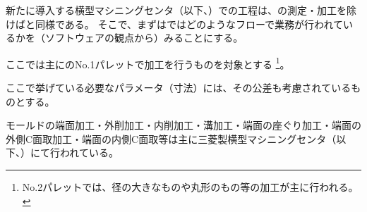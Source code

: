 

新たに導入する横型マシニングセンタ（以下、\textbf{\DMname}）での工程は、\dimple の測定・加工を除けば\MMname と同様である。
そこで、まずは\MMname ではどのようなフローで業務が行われているかを（ソフトウェアの観点から）みることにする。
\begin{marker}
ここでは主に\MMname のNo.1パレットで加工を行うものを対象とする
\footnote{No.2パレットでは、径の大きなものや丸形のもの等の加工が主に行われる。}。
\end{marker}
\begin{marker}
ここで挙げている必要なパラメータ（寸法）には、その公差も考慮されているものとする。
\end{marker}






モールドの端面加工・外削加工・内削加工・溝加工・端面の座ぐり加工・端面の外側C面取加工・端面の内側C面取等は主に三菱製横型マシニングセンタ（以下、\textbf{\MMname}）にて行われている。



